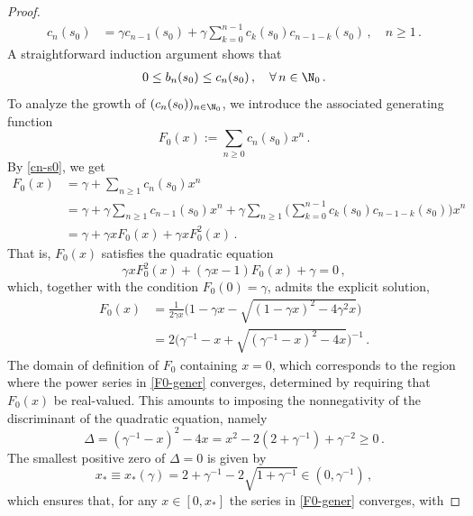 \documentclass[a4paper,reqno,10pt]{article}
\begin{document}
\begin{proof}
\begin{align}
		c_n(s_0) & = \gamma  c_{n-1}(s_0)  + \gamma  \sum_{k=0}^{n-1}  c_{k}(s_0) c_{n-1-k}(s_0) \,, \quad n\geq 1 \,. \label{cn-s0}
	\end{align}
	A straightforward induction argument shows that \begin{align}\label{bn-cn}0\leq b_n(s_0) \leq c_n(s_0)\,, \quad  \forall \, n\in\N_{0}\,.
    \end{align}
    To analyze the growth of $(c_n(s_0))_{n\in\N_0}$, we introduce the associated generating function 
	\begin{equation}\label{F0-gener}
		F_0(x) := \sum_{n\geq 0} c_n(s_0) x^n \,.
	\end{equation}
	By \eqref{cn-s0}, we get
	\begin{align}
		F_0(x) & =  \gamma + \sum_{n\geq 1} c_{n}(s_0) x^n \\
		& = \gamma + \gamma \sum_{n\geq 1} c_{n-1}(s_0) x^n + \gamma \sum_{n\geq 1} \Big( \sum_{k=0}^{n-1} c_{k}(s_0) c_{n-1-k}(s_0) \Big) x^{n} \\
		& = \gamma + \gamma x F_0(x) + \gamma x F_0^2(x) \,.
	\end{align}
	That is, $F_0(x)$ satisfies the quadratic  equation
	\begin{equation}
		\gamma x F_0^2(x) + (\gamma x -1)F_0(x) + \gamma = 0 \,,
	\end{equation}
	which, together with the condition $F_0(0)=\gamma$, admits the explicit solution, 
	\begin{align}
		F_0(x) & = \frac{1}{2\gamma x} \Big( 1 - \gamma x - \sqrt{ (1-\gamma x)^2 - 4\gamma^2 x } \Big) \\
		& =  2\Big( \gamma^{-1} -  x + \sqrt{ (\gamma^{-1}- x)^2 - 4 x } \Big)^{-1} \,.\label{F0-form}
	\end{align}
The domain of definition of $F_0$ containing $x=0$, which corresponds to the region where the power series in \eqref{F0-gener} converges, determined by requiring that $F_0(x)$ be real-valued. This amounts to imposing the nonnegativity of the discriminant of the quadratic equation, namely
	\begin{equation}
	\Delta = 	(\gamma^{-1}- x)^2 - 4 x  = x^2 - 2(2+\gamma^{-1}) +\gamma^{-2} \geq 0\,.
	\end{equation}
	The smallest positive zero of $\Delta= 0$ is given by
	\begin{equation}\label{x.star}
		x_* \equiv x_*(\gamma)= 2 + \gamma^{-1} - 2 \sqrt{1+ \gamma^{-1}} \in (0, \gamma^{-1}) \,,
	\end{equation}
	which ensures that, for any $x\in [0,x_*]$ the series in \eqref{F0-gener} converges, with 

\end{proof}
\end{document}
